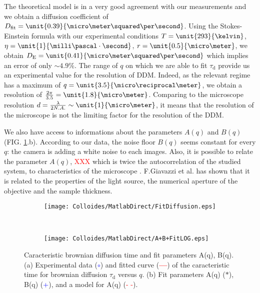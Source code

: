 \documentclass[%
 aip,
 jmp,%
 amsmath,amssymb,
reprint,%
]{revtex4-1}
\begin{document}
The theoretical model is in a very good agreement with our measurements and we obtain a diffusion coefficient of $D_\text{fit} = \unit{0.39}{\micro\meter\squared\per\second}$. Using the Stokes-Einstein formula with our experimental conditions $T = \unit{293}{\kelvin}$, $\eta = \unit{1}{\milli\pascal\cdot\second}$, $r = \unit{0.5}{\micro\meter}$, we obtain $D_\text{E} = \unit{0.41}{\micro\meter\squared\per\second}$ which implies an error of only $\sim 4.9 \%$. The range of $q$ on which we are able to fit $\tau_\text{d}$ provide us an experimental value for the resolution of DDM. Indeed, as the relevant regime has a maximum of $q=\unit{3.5}{\micro\reciprocal\meter}$, we obtain a resolution of $\frac{2\pi}{3.5} = \unit{1.8}{\micro\meter}$. Comparing to the microscope resolution $d = \frac{\lambda}{2 N.A.} \sim \unit{1}{\micro\meter}$, it means that the resolution of the microscope is not the limiting factor for the resolution of the DDM.

We also have access to informations about the parameters $A(q)$ and $B(q)$ (FIG. \ref{FitDiffColl}.b). According to our data, the noise floor $B(q)$ seems constant for every $q$: the camera is adding a white noise to each images. Also, it is possible to relate the parameter $A(q)$, \textcolor{red}{XXX} which is twice the autocorrelation of the studied system, to characteristics of the microscope \citep{3_DDM3D}. F.Giavazzi et al. has shown that it is related to the properties of the light source, the numerical aperture of the objective and the sample thickness.

\begin{figure}[H]
	\hspace{-1.5mm}
	\begin{subfigure}[b]{\linewidth}
		\centering
		\texttt{[image: Colloides/MatlabDirect/FitDiffusion.eps]}		
	\end{subfigure}
	\\
	\begin{subfigure}[b]{\linewidth}
		\centering
		\texttt{[image: Colloides/MatlabDirect/A+B+FitLOG.eps]}
	\end{subfigure}
	\caption{Caracteristic brownian diffusion time and fit parameters A(q), B(q).(a) Experimental data (\textcolor{blue}{$\circ$}) and fitted curve (\textcolor{red}{\textbf{---}}) of the caracteristic time for brownian diffusion $\tau_\text{d}$ versus $q$. (b) Fit parameters A(q) ($\ast$), B(q) (\textcolor{blue}{+}), and a model for A(q) (\textcolor{red}{- -}).}
	\label{FitDiffColl}
\end{figure}
\end{document}
